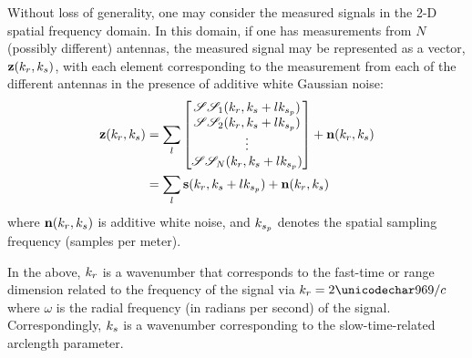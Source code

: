 \par
Without loss of generality, one may consider the measured signals in the 2-D spatial frequency domain. In this domain, if one has measurements from $N$ (possibly different) antennas, the measured signal may be represented as a vector, $\mathbf{z}(k_r, k_{s})$, with each element corresponding to the measurement from each of the different antennas in the presence of additive white Gaussian noise: 
\begin{equation}
\begin{split}
 \mathbf{z}(k_r, k_{s}) &= \sum_l\begin{bmatrix}\mathscr{S}\mathscr{S}_{1}(k_r, k_{s} + lk_{s_p})\\\mathscr{S}\mathscr{S}_{2}(k_r, k_{s} + lk_{s_p})\\\vdots\\\mathscr{S}\mathscr{S}_{N}(k_r, k_{s} + lk_{s_p})\end{bmatrix} + \mathbf{n}(k_r, k_{s})\\
 &= \sum_l\mathbf{s}(k_r, k_{s} + lk_{s_p}) + \mathbf{n}(k_r, k_{s})
 \end{split}
\end{equation}
where $\mathbf{n}(k_r, k_{s})$ is additive white noise, and $k_{s_p}$ denotes the spatial sampling frequency (samples per meter).
\par
In the above, $k_r$ is a wavenumber that corresponds to the fast-time or range dimension related to the frequency of the signal via $\kr=2\omega/c$ where $\omega$ is the radial frequency (in radians per second) of the signal. Correspondingly, $k_{s}$ is a wavenumber corresponding to the slow-time-related arclength parameter.
